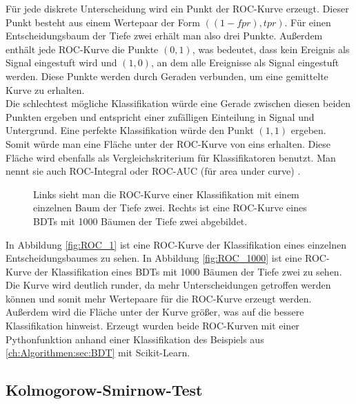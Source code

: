 F\"ur jede diskrete Unterscheidung wird ein Punkt der ROC-Kurve erzeugt. Dieser Punkt besteht aus einem Wertepaar der Form $((1-fpr),tpr)$. F\"ur einen Entscheidungsbaum der Tiefe zwei erh\"alt man also drei Punkte. Au\ss erdem enth\"alt jede ROC-Kurve die Punkte $(0,1)$, was bedeutet, dass kein Ereignis als Signal eingestuft wird und $(1,0)$, an dem alle Ereignisse als Signal eingestuft werden. Diese Punkte werden durch Geraden verbunden, um eine gemittelte Kurve zu erhalten.\\
Die schlechtest m\"ogliche Klassifikation w\"urde eine Gerade zwischen diesen beiden Punkten ergeben und entspricht einer zuf\"alligen Einteilung in Signal und Untergrund. Eine perfekte Klassifikation w\"urde den Punkt $(1,1)$ ergeben. Somit w\"urde man eine Fl\"ache unter der ROC-Kurve von eins erhalten. Diese Fl\"ache wird ebenfalls als Vergleichskriterium f\"ur Klassifikatoren benutzt. Man nennt sie auch ROC-Integral oder ROC-AUC (f\"ur area under curve) \cite{ROC_Graphs}.

\begin{figure}[tbp]
\centering     %
{}
\caption{Links sieht man die ROC-Kurve einer Klassifikation mit einem einzelnen Baum der Tiefe zwei. Rechts ist eine ROC-Kurve eines BDTs mit 1000 B\"aumen der Tiefe zwei abgebildet.}
\end{figure}

In Abbildung \ref{fig:ROC_1} ist eine ROC-Kurve der Klassifikation eines einzelnen Entscheidungsbaumes zu sehen. In Abbildung \ref{fig:ROC_1000} ist eine ROC-Kurve der Klassifikation eines BDTs mit 1000 B\"aumen der Tiefe zwei zu sehen. Die Kurve wird deutlich runder, da mehr Unterscheidungen getroffen werden k\"onnen und somit mehr Wertepaare f\"ur die ROC-Kurve erzeugt werden. Au\ss erdem wird die Fl\"ache unter der Kurve gr\"o\ss er, was auf die bessere Klassifikation hinweist.
Erzeugt wurden beide ROC-Kurven mit einer Pythonfunktion anhand einer Klassifikation des Beispiels aus \ref{ch:Algorithmen:sec:BDT} mit Scikit-Learn.

\subsection{Kolmogorow-Smirnow-Test}
\label{ch:Vergleich:subsec:KSTest}

